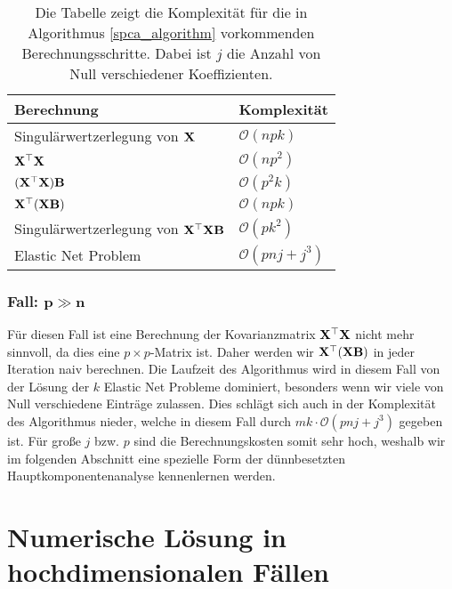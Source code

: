 \begin{table}
\centering
\begin{tabular}{ll}
Berechnung & Komplexität\\\hline\addlinespace
Singulärwertzerlegung von $\mathbf{X}$ & $\mathcal{O}(npk)$\\
$\mathbf{X}^{\top}\mathbf{X}$ & $\mathcal{O}(np^2)$\\
$(\mathbf{X}^{\top}\mathbf{X}) \mathbf{B}$ & $\mathcal{O}(p^2k)$\\
$\mathbf{X}^{\top} (\mathbf{X} \mathbf{B})$ & $\mathcal{O}(npk)$\\
Singulärwertzerlegung von $\mathbf{X}^{\top}\mathbf{X} \mathbf{B}$ & $\mathcal{O}(pk^2)$\\
Elastic Net Problem & $\mathcal{O}(pnj + j^3)$
\end{tabular}
\caption{Die Tabelle zeigt die Komplexität für die in Algorithmus \ref{spca_algorithm} vorkommenden Berechnungsschritte. Dabei ist $j$ die Anzahl von Null verschiedener Koeffizienten.}
\label{complexity_calculation}
\end{table}

\subsubsection{Fall: $\mathbf{p \gg n}$}

Für diesen Fall ist eine Berechnung der Kovarianzmatrix $\mathbf{X}^{\top}\mathbf{X}$ nicht mehr sinnvoll, da dies eine $p \times p$-Matrix ist. Daher werden wir $\mathbf{X}^{\top}(\mathbf{X} \mathbf{B})$ in jeder Iteration naiv berechnen. Die Laufzeit des Algorithmus wird in diesem Fall von der Lösung der $k$ Elastic Net Probleme dominiert, besonders wenn wir viele von Null verschiedene Einträge zulassen. Dies schlägt sich auch in der Komplexität des Algorithmus nieder, welche in diesem Fall durch $mk\cdot\mathcal{O}(pnj + j^3)$ gegeben ist. Für große $j$ bzw. $p$ sind die Berechnungskosten somit sehr hoch, weshalb wir im folgenden Abschnitt eine spezielle Form der dünnbesetzten Hauptkomponentenanalyse kennenlernen werden.



\section{Numerische Lösung in hochdimensionalen Fällen}
\label{numerical_solution_p_greater_n}

